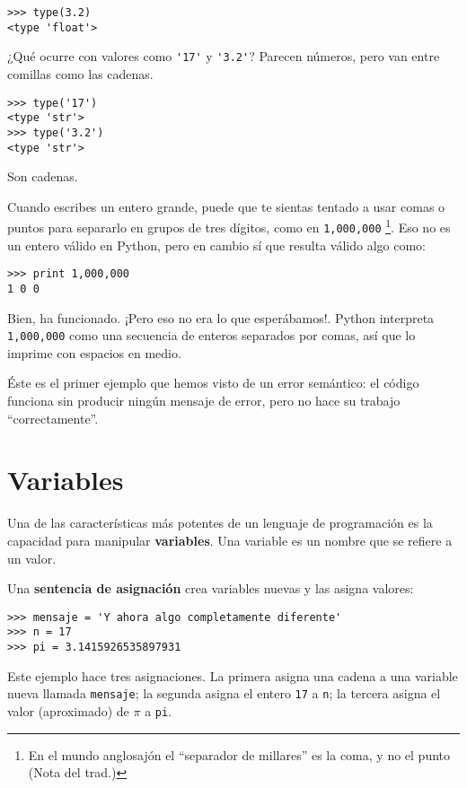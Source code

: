 \beforeverb
\begin{verbatim}
>>> type(3.2)
<type 'float'>
\end{verbatim}
\afterverb
%
¿Qué ocurre con valores como \verb"'17'" y \verb"'3.2'"?
Parecen números, pero van entre comillas como
las cadenas.


\beforeverb
\begin{verbatim}
>>> type('17')
<type 'str'>
>>> type('3.2')
<type 'str'>
\end{verbatim}
\afterverb
%
Son cadenas.

Cuando escribes un entero grande, puede que te sientas tentado a usar comas
o puntos para separarlo en grupos de tres dígitos, como en {\tt 1,000,000}
\footnote{En el mundo anglosajón el ``separador de millares'' es la coma, y no el punto (Nota del trad.)}.
Eso no es un entero válido en Python, pero en cambio sí que resulta válido algo como:

\beforeverb
\begin{verbatim}
>>> print 1,000,000
1 0 0
\end{verbatim}
\afterverb
%
Bien, ha funcionado. ¡Pero eso no era lo que esperábamos!. Python interpreta
{\tt 1,000,000} como una secuencia de enteros separados por comas, así que lo
imprime con espacios en medio.


Éste es el primer ejemplo que hemos visto de un error semántico: el código
funciona sin producir ningún mensaje de error, pero no hace su trabajo
``correctamente''.

\section{Variables}

Una de las características más potentes de un lenguaje de programación es
la capacidad para manipular {\bf variables}. Una variable es un nombre
que se refiere a un valor.

Una {\bf sentencia de asignación} crea variables nuevas y las
asigna valores:

\beforeverb
\begin{verbatim}
>>> mensaje = 'Y ahora algo completamente diferente'
>>> n = 17
>>> pi = 3.1415926535897931
\end{verbatim}
\afterverb
%
Este ejemplo hace tres asignaciones. La primera asigna una cadena
a una variable nueva llamada {\tt mensaje};
la segunda asigna el entero {\tt 17} a {\tt n}; la tercera
asigna el valor (aproximado) de $\pi$ a {\tt pi}.

